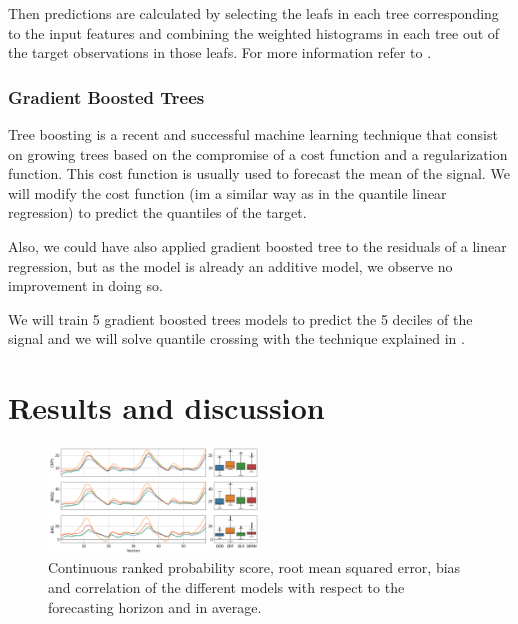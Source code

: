 \documentclass[a4paper,twocolumn,5p]{elsarticle}
\begin{document}
Then predictions are calculated by selecting the leafs in each tree
corresponding to the input features and combining the weighted
histograms in each tree out of the target observations in those leafs.
For more information refer to \cite{quantregforests}.

\subsubsection{Gradient Boosted Trees}

Tree boosting \cite{friedman_greedy_2001} is a recent and successful
machine learning technique that consist on growing trees based on the
compromise of a cost function and a regularization function. This cost
function is usually used to forecast the mean of the signal. We will
modify the cost function (im a similar way as in the quantile linear
regression) to predict the quantiles of the target.

Also, we could have also applied gradient boosted tree to the
residuals of a linear regression, but as the model is already an
additive model, we observe no improvement in doing so.

We will train 5 gradient boosted trees models to predict the 5 deciles
of the signal and we will solve quantile crossing with the technique
explained in \cite{cross}.


\section{Results and discussion}
\label{sec:results}

\begin{figure}[tbp]
  \centering
  \includegraphics[width=0.5\textwidth]{error_graph}
  \caption{\label{figure:errorGraph}
    Continuous ranked probability score, root mean squared
    error, bias and correlation of the different models with respect to the
    forecasting horizon and in average.%
  }
\end{figure}
\end{document}
